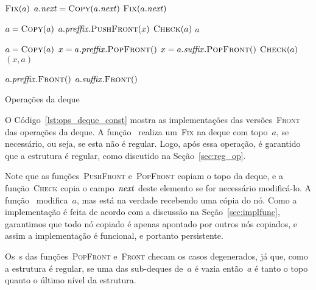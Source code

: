 \documentclass[main.tex]{subfiles}
\begin{document}
\begin{algorithm}
\begin{algorithmic}[1]

        \State $\Call{Fix}{a}$
        \State $a.\V{next} = \Call{Copy}{a.\V{next}}$
        \State $\Call{Fix}{a.\V{next}}$
    \EndIf
\EndFunction

    \State $a = \Call{Copy}{a}$
    \State $a.\V{preffix}.\Call{PushFront}{x}$
    \State $\Call{Check}{a}$
    \State \Return $a$
\EndFunction

    \State $a = \Call{Copy}{a}$
        \State $x = a.\V{preffix}.\Call{PopFront}{\null}$
    \Else
        \State $x = a.\V{suffix}.\Call{PopFront}{\null}$
    \EndIf
    \State $\Call{Check}{a}$
    \State \Return $(x, a)$
\EndFunction

        \State \Return $a.\V{preffix}.\Call{Front}{\null}$
    \Else
        \State \Return $a.\V{suffix}.\Call{Front}{\null}$
    \EndIf
\EndFunction

\end{algorithmic}
\caption{Operações da deque} \label{lst:ops_deque_const}
\end{algorithm}

O Código~\ref{lst:ops_deque_const} mostra as implementações das versões~\textsc{Front} das operações da deque. A função~ realiza um~\textsc{Fix} na deque com topo~$a$, se necessário, ou seja, se esta não é regular. Logo, após essa operação, é garantido que a estrutura é regular, como discutido na Seção~\ref{sec:reg_op}.

Note que as funções~\textsc{PushFront} e~\textsc{PopFront} copiam o topo da deque, e a função~\textsc{Check} copia o campo~$\mathit{next}$ deste elemento se for necessário modificá-lo. A função~ modifica~$a$, mas está na verdade recebendo uma cópia do nó. Como a implementação é feita de acordo com a discussão na Seção~\ref{sec:implfunc}, garantimos que todo nó copiado é apenas apontado por outros nós copiados, e assim a implementação é funcional, e portanto persistente.


Os~s das funções~\textsc{PopFront} e~\textsc{Front} checam os casos degenerados, já que, como a estrutura é regular, se uma das sub-deques de~$a$ é vazia então~$a$ é tanto o topo quanto o último nível da estrutura.
\end{document}
